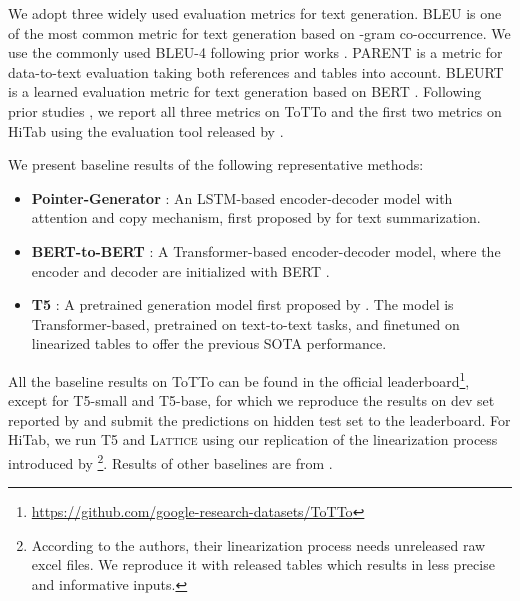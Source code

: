\documentclass[11pt]{article}
\newcommand{\stitle}[1]{\vspace{1ex} \noindent{\bf #1.}}
\newcommand{\model}{\mbox{\textsc{Lattice}}\xspace}
\begin{document}
\stitle{Evaluation Metrics}
We adopt three widely used evaluation metrics for text generation.
BLEU \citep{papineni2002bleu} is one of the most common metric for text generation based on -gram co-occurrence. We use the commonly used BLEU-4 following prior works \citep{parikh2020totto, cheng2021hitab}.
PARENT \citep{dhingra2019handling} is a metric for data-to-text evaluation taking both references and tables into account.
BLEURT \citep{sellam2020bleurt} is a learned evaluation metric for text generation based on BERT \cite{devlin2019bert}.
Following prior studies \citep{parikh2020totto, cheng2021hitab}, we report all three metrics on ToTTo and the first two metrics on HiTab using the evaluation tool released by \citet{parikh2020totto}.

\stitle{Baselines}
We present baseline results of the following representative methods:




\begin{itemize}[leftmargin=*]
\setlength\itemsep{-0.1em}
\item \textbf{Pointer-Generator} \citep{gehrmann2018end}: An LSTM-based encoder-decoder model with attention and copy mechanism, first proposed by \citet{see2017get} for text summarization.
\item \textbf{BERT-to-BERT} \citep{rothe2020leveraging}: A Transformer-based encoder-decoder model, where the encoder and decoder are initialized with BERT \citep{devlin2019bert}.
\item \textbf{T5} \citep{kale2020text}: A pretrained generation model first proposed by \citet{raffel2020exploring}. The model is Transformer-based, pretrained on text-to-text tasks, and finetuned on linearized tables to offer the previous SOTA performance.
\end{itemize}





All the baseline results on ToTTo can be found in the official leaderboard\footnote{\url{https://github.com/google-research-datasets/ToTTo}}, except for T5-small and T5-base, for which we reproduce the results on dev set reported by \citet{kale2020text} and submit the predictions on hidden test set to the leaderboard.
For HiTab, we run T5 and \model using our replication of the linearization process introduced by \citet{cheng2021hitab}\footnote{According to the authors, their linearization process needs unreleased raw excel files. We reproduce it with released tables which results in less precise and informative inputs.}. Results of other baselines are from \citet{cheng2021hitab}.
\end{document}
